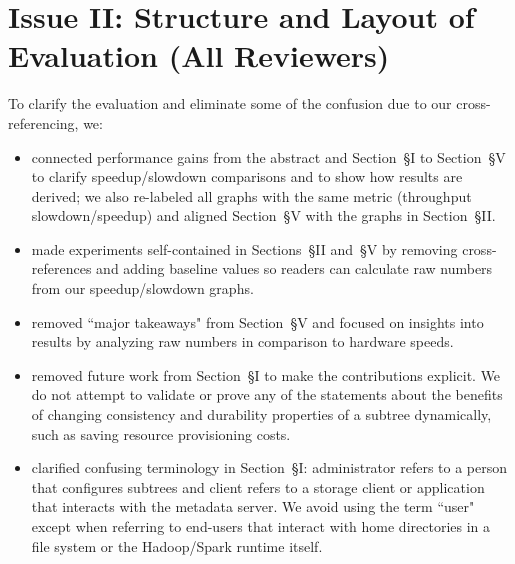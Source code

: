 \documentclass[onecolumn,conference]{IEEEtran}
\begin{document}
\section*{Issue II: Structure and Layout of Evaluation (All Reviewers)}

To clarify the evaluation and eliminate some of the confusion due to our
cross-referencing, we:

\begin{itemize}

  \item connected performance gains from the abstract and Section~{\S}I to
Section~{\S}V to clarify speedup/slowdown comparisons and to show how results
are derived; we also re-labeled all graphs with the same metric (throughput
slowdown/speedup) and aligned Section~{\S}V with the graphs in Section~{\S}II.

  \item made experiments self-contained in Sections~{\S}II and~{\S}V by
removing cross-references and adding baseline values so readers can calculate
raw numbers from our speedup/slowdown graphs. 


  \item removed ``major takeaways" from Section~{\S}V and focused on
insights into results by analyzing raw numbers in comparison to hardware
speeds.

  \item removed future work from Section~{\S}I to make the contributions
explicit. We do not attempt to validate or prove any of the statements about
the benefits of changing consistency and durability properties of a subtree
dynamically, such as saving resource provisioning costs.  

  \item clarified confusing terminology in Section~{\S}I: administrator refers
to a person that configures subtrees and client refers to a storage client or
application that interacts with the metadata server. We avoid using the term
``user" except when referring to end-users that interact with home directories
in a file system or the Hadoop/Spark runtime itself.

\end{itemize}
\end{document}
